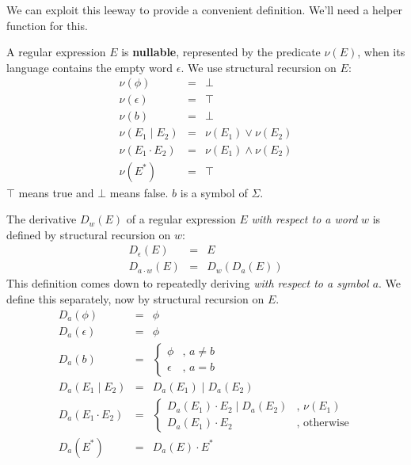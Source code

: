 We can exploit this leeway to provide a convenient definition. We'll need a helper function for this.
\begin{definition}[Nullability of an RE]
	A regular expression $E$ is \textbf{nullable}, represented by the predicate $\nu(E)$, when its language contains the empty word $\epsilon$. We use structural recursion on $E$:
	\begin{eqnarray*}
		\nu(\phi)           & = & \bot \\
		\nu(\epsilon)       & = & \top \\
		\nu(b)              & = & \bot \\
		\nu(E_1 \mid E_2)   & = & \nu(E_1) \vee \nu(E_2)  \\
		\nu(E_1 \cdot E_2)  & = & \nu(E_1) \wedge \nu(E_2) \\
		\nu(E^*)            & = & \top
	\end{eqnarray*}
	$\top$ means true and $\bot$ means false. $b$ is a symbol of $\Sigma$.
\end{definition}
\begin{definition}\label{def:derivative}
	The derivative $D_w(E)$ of a regular expression $E$ \emph{with respect to a word} $w$ is
	defined by structural recursion on $w$: 
	\begin{eqnarray*}
		D_\epsilon(E)     & = & E \\
		D_{a \cdot w}(E)  & = & D_w(D_a(E))
	\end{eqnarray*}
	This definition comes down to repeatedly deriving \emph{with respect to a symbol $a$}. We define this separately, now by structural recursion on $E$.
	\begin{eqnarray*}
		D_a(\phi)           & = & \phi \\
		D_a(\epsilon)       & = & \phi \\
		D_a(b)              & = & \left\{ \begin{array}{ll} \phi & \text{, }a \neq b \\ \epsilon & \text{, }a = b \end{array}\right. \\
		D_a(E_1 \mid E_2)   & = & D_a(E_1) \mid D_a(E_2) \\
		D_a(E_1 \cdot E_2)  & = & \left\{ \begin{array}{ll} D_a(E_1) \cdot E_2 \mid D_a(E_2) & \text{, }\nu(E_1)  \\ D_a(E_1) \cdot E_2 & \text{, otherwise} \end{array}\right. \\
		D_a(E^*)            & = & D_a(E) \cdot E^*
	\end{eqnarray*}
\end{definition}

